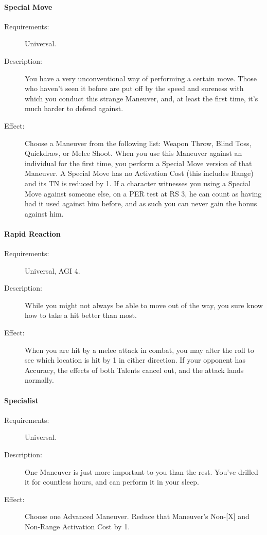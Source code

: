 \documentclass[oneside,11pt,english]{book}
\begin{document}
\paragraph{\label{talent:Special Move}Special Move}
	\begin{description}
		\item [Requirements:] Universal. 
		\item [Description:] You have a very unconventional way of performing a certain move. Those who haven't seen 
it before are put off by the speed and sureness with which you conduct this strange Maneuver, and, at 
least the first time, it's much harder to defend against. 
		\item [Effect:] Choose a Maneuver from the following list: Weapon Throw, Blind Toss, Quickdraw, or Melee Shoot. When you use this Maneuver against an individual for the first time, you perform a Special Move 
version of that Maneuver. A Special Move has no Activation Cost (this includes Range) and its TN is 
reduced by 1. If a character witnesses you using a Special Move against someone else, on a PER test at 
RS 3, he can count as having had it used against him before, and as such you can never gain the bonus 
against him. 

	\end{description}
\paragraph{\label{talent:Rapid Reaction}Rapid Reaction}
	\begin{description}
		\item [Requirements:] Universal, AGI 4. 
		\item [Description:] While you might not always be able to move out of the way, you sure know how to take a hit better than most. 
		\item [Effect:] When you are hit by a melee attack in combat, you may alter the roll to see which location is hit by 1 in either direction. If your opponent has Accuracy, the effects of both Talents cancel out, and the 
attack lands normally. 


	\end{description}
\paragraph{Specialist}\label{talent:Specialist}
	\begin{description}
		\item [Requirements:] Universal.
		\item [Description:] One Maneuver is just more important to you than the rest. You’ve drilled it for countless hours, and can perform it in your sleep. 
		\item [Effect:] Choose one Advanced Maneuver. Reduce that Maneuver’s Non-[X] and Non-Range Activation Cost by 1.
	\end{description}
\end{document}
